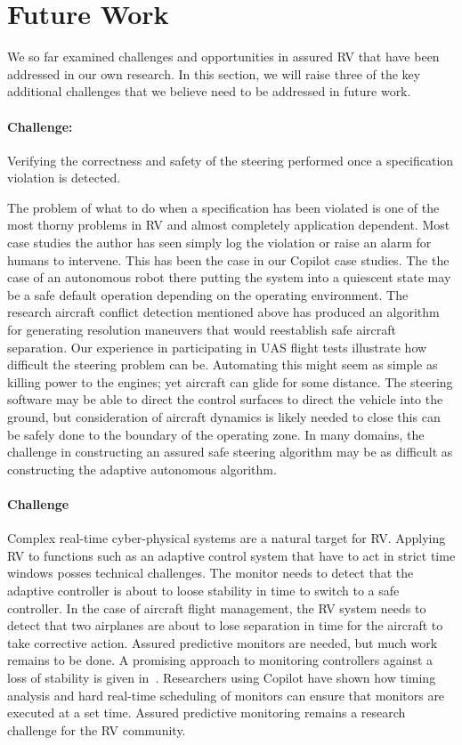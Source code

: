 \section{Future Work}\label{sec:future} 
We  so far examined challenges and opportunities in assured  RV that
have been addressed in our own research. In this section, we will
raise  three of the key additional  challenges that we believe need to be
addressed in future work. 


\paragraph{Challenge:}  Verifying the correctness and safety of the
steering performed once a specification violation is detected. 
  
The problem of what to do when a specification has been violated is
one of the most thorny problems in RV and almost completely
application dependent.  Most case studies the author has seen simply
log the violation or raise an alarm for humans to intervene. This has
been the case in our Copilot case studies. The the case of an
autonomous robot there putting the system into a quiescent state may
be a safe default operation depending on the operating environment.
The research aircraft conflict detection mentioned above has produced
an algorithm for generating resolution maneuvers that would
reestablish safe aircraft separation. Our experience in participating
in UAS flight tests illustrate how difficult the steering problem can
be. Automating this might seem as simple as killing power to the
engines; yet aircraft can glide for some distance. The steering
software may be able to direct the control surfaces to direct the
vehicle into the ground, but consideration of aircraft dynamics is
likely needed to close this can be safely done to the boundary of the
operating zone.  In many domains, the challenge in constructing an
assured safe steering algorithm may be as difficult as constructing
the adaptive autonomous algorithm.

\paragraph{Challenge} 

Complex  real-time cyber-physical systems  are a natural target for
RV.  Applying RV to  functions such as an  adaptive control system
that have to act in strict time windows posses  technical
challenges. The monitor needs to detect  that the adaptive
controller is about to loose stability in time to  switch to a safe
controller. In the case of aircraft flight management, the RV system
needs to detect that  two airplanes are about to lose separation in
time for the aircraft to take corrective action.   Assured predictive
monitors are needed, but much work remains to be done. A promising
approach to monitoring controllers against a loss of stability is
given in~\cite{}. Researchers using Copilot have shown how  timing
analysis and  hard real-time scheduling of monitors can ensure that
monitors are executed at a set time.  Assured predictive monitoring
remains a research challenge for the RV community.



